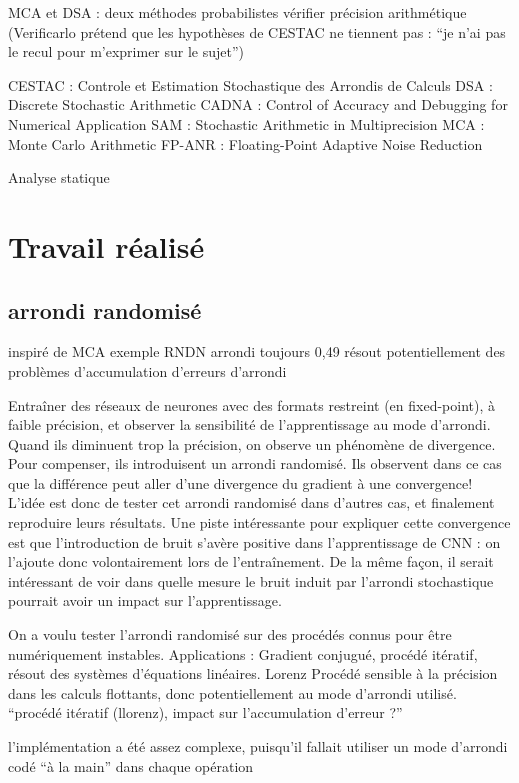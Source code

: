 \documentclass[a4paper,11pt]{article}
\begin{document}
MCA et DSA : deux méthodes probabilistes vérifier précision arithmétique
(Verificarlo prétend que les hypothèses de CESTAC ne tiennent pas : “je n’ai pas le recul pour m’exprimer sur le sujet”)

CESTAC : Controle et Estimation Stochastique des Arrondis de Calculs
DSA : Discrete Stochastic Arithmetic
CADNA : Control of Accuracy and Debugging for Numerical Application
SAM : Stochastic Arithmetic in Multiprecision
MCA : Monte Carlo Arithmetic
FP-ANR : Floating-Point Adaptive Noise Reduction

Analyse statique

\section{Travail réalisé}

\subsection{ arrondi randomisé }
inspiré de MCA
exemple RNDN arrondi toujours 0,49
résout potentiellement des problèmes d’accumulation d’erreurs d’arrondi

Entraîner des réseaux de neurones avec des formats restreint (en fixed-point), à faible précision, et observer la sensibilité de l’apprentissage au mode d’arrondi.
Quand ils diminuent trop la précision, on observe un phénomène de divergence. Pour compenser, ils introduisent un arrondi randomisé.
Ils observent dans ce cas que la différence peut aller d’une divergence du gradient à une convergence!
L’idée est donc de tester cet arrondi randomisé dans d’autres cas, et finalement reproduire leurs résultats.
Une piste intéressante pour expliquer cette convergence est que l’introduction de bruit s’avère positive dans l’apprentissage de CNN : on l’ajoute donc volontairement lors de l’entraînement. De la même façon, il serait intéressant de voir dans quelle mesure le bruit induit par l’arrondi stochastique pourrait avoir un impact sur l’apprentissage.


On a voulu tester l’arrondi randomisé sur des procédés connus pour être numériquement instables.
Applications : 
Gradient conjugué, procédé itératif, résout des systèmes d’équations linéaires.
Lorenz Procédé sensible à la précision dans les calculs flottants, donc potentiellement au mode d’arrondi utilisé.
“procédé itératif (llorenz), impact sur l’accumulation d’erreur ?”

l’implémentation a été assez complexe, puisqu’il fallait utiliser un mode d’arrondi codé “à la main” dans chaque opération
\end{document}
